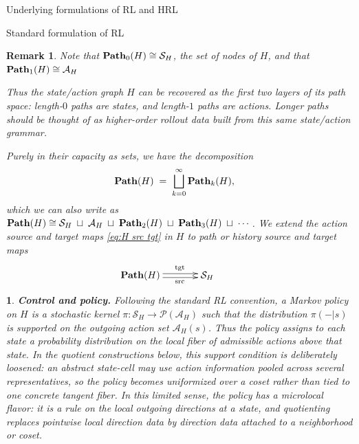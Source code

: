 \documentclass[11pt]{article}
\newtheorem{remark}[subsubsection]{Remark}
\newtheorem{ermark}[subsubsection]{}
\begin{document}
\begin{section}{Underlying formulations of RL and HRL}
\begin{subsection}{Standard formulation of RL}
\begin{remark}
Note that $\bold{Path}_{0}(H)\cong\mathcal{S}_{H}$, the set of nodes of $H$, and that $\bold{Path}_{1}(H)\cong\mathcal{A}_{H}$

Thus the state/action graph $H$ can be recovered as the first two layers of its path space: length-$0$ paths are states, and length-$1$ paths are actions. Longer paths should be thought of as higher-order rollout data built from this same state/action grammar.

Purely in their capacity as sets, we have the decomposition
$$
\!\!\!\!\!\!
\bold{Path}(H)\;=\;\bigsqcup_{k=0}^{\infty}\bold{Path}_{k}(H),
$$
which we can also write as
$
\bold{Path}(H)
\cong
\mathcal{S}_{H}\;\sqcup\;\mathcal{A}_{H}\;\sqcup\;\bold{Path}_{2}(H)\;\sqcup\;\bold{Path}_{3}(H)\;\sqcup\;\cdots
$.
We extend the action source and target maps \eqref{eq:H src tgt} in $H$ to {\em path} or {\em history source} and {\em target} maps
$$
\begin{xy}
(0,0)*+{\!\!\!\!\!\!\!\!\!\!\!\!\!\!\!\bold{Path}(H)}="1";
(20,0)*+{\mathcal{S}_{H}}="2";
{\ar@<2pt>^{\text{tgt}} "1"; "2"}
{\ar@<-2pt>_{\text{src}} "1"; "2"}
\end{xy}
$$
\end{remark}

\begin{ermark}
{\bf Control and policy.}
\normalfont
Following the standard RL convention, a Markov policy on $H$ is a stochastic kernel
$
\pi:\mathcal{S}_{H}\longrightarrow\mathcal{P}(\mathcal{A}_{H})
$
such that the distribution $\pi(-|s)$ is supported on the outgoing action set $\mathcal{A}_{H}(s)$. Thus the policy assigns to each state a probability distribution on the local fiber of admissible actions above that state. In the quotient constructions below, this support condition is deliberately loosened: an abstract state-cell may use action information pooled across several representatives, so the policy becomes uniformized over a coset rather than tied to one concrete tangent fiber. In this limited sense, the policy has a microlocal flavor: it is a rule on the local outgoing directions at a state, and quotienting replaces pointwise local direction data by direction data attached to a neighborhood or coset.


\end{ermark}
\end{subsection}
\end{section}
\end{document}
